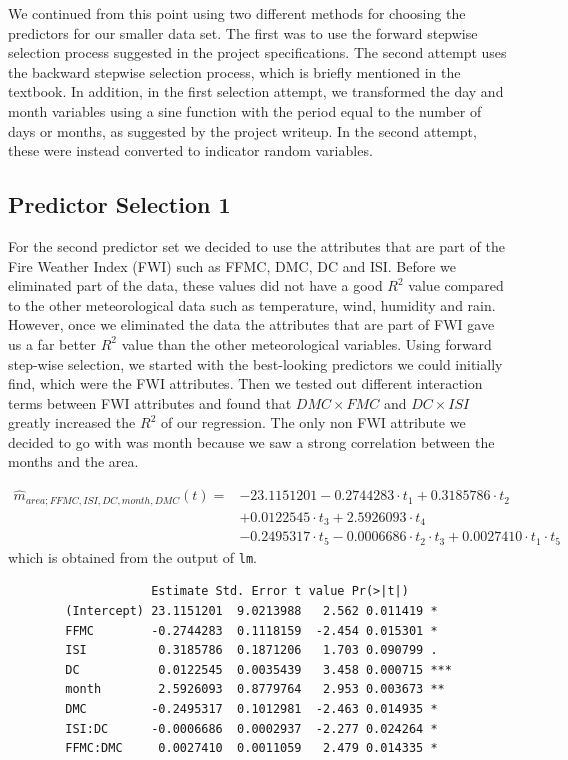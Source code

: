 \documentclass{article}
\begin{document}
We continued from this point using two different methods for choosing the
predictors for our smaller data set. The first was to use the forward stepwise
selection process suggested in the project specifications. The second attempt
uses the backward stepwise selection process, which is briefly mentioned in the
textbook. In addition, in the first selection attempt, we transformed the day
and month variables using a sine function with the period equal to the number
of days or months, as suggested by the project writeup. In the second attempt,
these were instead converted to indicator random variables.

\subsection{Predictor Selection 1}

For the second predictor set we decided to use the attributes that are part of
the Fire Weather Index (FWI) such as FFMC, DMC, DC and ISI.  Before we
eliminated part of the data, these values did not have a good $R^{2}$ value
compared to the other meteorological data such as temperature, wind, humidity
and rain. However, once we eliminated the data the attributes that are part of
FWI gave us a far better $R^{2}$ value than the other meteorological variables.
Using forward step-wise selection, we started with the best-looking predictors
we could initially find, which were the FWI attributes. Then we tested out
different interaction terms between FWI attributes and found that $DMC \times
FMC$  and $DC \times ISI$ greatly increased the $R^{2}$ of our regression. The
only non FWI attribute we decided to go with was month because we saw a strong
correlation between the months and the area.

\begin{align*}
  \widehat{m}_{area;FFMC,ISI,DC,month,DMC}(t) = &-23.1151201 - 0.2744283 \cdot t_1 + 0.3185786 \cdot t_2 \\
  &+ 0.0122545 \cdot t_3 + 2.5926093 \cdot t_4 \\
  &- 0.2495317 \cdot t_5 - 0.0006686 \cdot t_2 \cdot t_3 + 0.0027410 \cdot t_1 \cdot t_5 	   
\end{align*}
which is obtained from the output of \verb=lm=.

\begin{verbatim}
              		Estimate Std. Error t value Pr(>|t|)    
		(Intercept) 23.1151201  9.0213988   2.562 0.011419 *  
		FFMC        -0.2744283  0.1118159  -2.454 0.015301 *  
		ISI          0.3185786  0.1871206   1.703 0.090799 .  
		DC           0.0122545  0.0035439   3.458 0.000715 ***
		month        2.5926093  0.8779764   2.953 0.003673 ** 
		DMC         -0.2495317  0.1012981  -2.463 0.014935 *  
		ISI:DC      -0.0006686  0.0002937  -2.277 0.024264 *  
		FFMC:DMC     0.0027410  0.0011059   2.479 0.014335 *
\end{verbatim}
\end{document}
